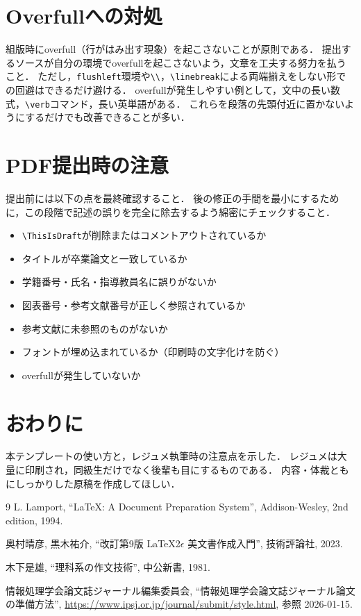 \section{Overfullへの対処}
\label{sec:overfull}

組版時にoverfull（行がはみ出す現象）を起こさないことが原則である．
提出するソースが自分の環境でoverfullを起こさないよう，文章を工夫する努力を払うこと．
ただし，\texttt{flushleft}環境や\verb|\\|，\verb|\linebreak|による両端揃えをしない形での回避はできるだけ避ける．
overfullが発生しやすい例として，文中の長い数式，\verb|\verb|コマンド，長い英単語がある．
これらを段落の先頭付近に置かないようにするだけでも改善できることが多い．

\section{PDF提出時の注意}
\label{sec:pdf}

提出前には以下の点を最終確認すること．
後の修正の手間を最小にするために，この段階で記述の誤りを完全に除去するよう綿密にチェックすること\cite{ipsj-sample}．
\begin{itemize}
    \item \verb|\ThisIsDraft|が削除またはコメントアウトされているか
    \item タイトルが卒業論文と一致しているか
    \item 学籍番号・氏名・指導教員名に誤りがないか
    \item 図表番号・参考文献番号が正しく参照されているか
    \item 参考文献に未参照のものがないか
    \item フォントが埋め込まれているか（印刷時の文字化けを防ぐ）
    \item overfullが発生していないか
\end{itemize}

\section{おわりに}
\label{sec:conclusion}

本テンプレートの使い方と，レジュメ執筆時の注意点を示した．
レジュメは大量に印刷され，同級生だけでなく後輩も目にするものである．
内容・体裁ともにしっかりした原稿を作成してほしい．

\begin{thebibliography}{9}
L. Lamport, ``\LaTeX: A Document Preparation System'', Addison-Wesley, 2nd edition, 1994.

奥村晴彦, 黒木祐介, ``改訂第9版 \LaTeX2$\epsilon$ 美文書作成入門'', 技術評論社, 2023.

木下是雄, ``理科系の作文技術'', 中公新書, 1981.

情報処理学会論文誌ジャーナル編集委員会, ``情報処理学会論文誌ジャーナル論文の準備方法'', \url{https://www.ipsj.or.jp/journal/submit/style.html}, 参照 2026-01-15.

\end{thebibliography}
